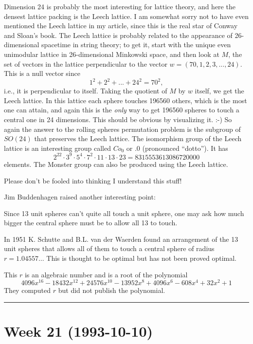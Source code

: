 \documentclass{article}
\begin{document}
Dimension 24 is probably the most interesting for lattice theory, and
here the densest lattice packing is the Leech lattice. I am somewhat
sorry not to have even mentioned the Leech lattice in my article, since
this is the real star of Conway and Sloan's book. The Leech lattice is
probably related to the appearance of 26-dimensional spacetime in string
theory; to get it, start with the unique even unimodular lattice in
26-dimensional Minkowski space, and then look at \(M\), the set of
vectors in the lattice perpendicular to the vector
\(w = (70,1,2,3,...,24)\). This is a null vector since
\[1^2 + 2^2 + ... + 24^2 = 70^2,\] i.e., it is perpendicular to itself.
Taking the quotient of \(M\) by \(w\) itself, we get the Leech lattice.
In this lattice each sphere touches 196560 others, which is the most one
can attain, and again this is the \emph{only} way to get 196560 spheres
to touch a central one in 24 dimensions. This should be obvious by
visualizing it. :-) So again the answer to the rolling spheres
permutation problem is the subgroup of \(SO(24)\) that preserves the
Leech lattice. The isomorphism group of the Leech lattice is an
interesting group called \(Co_0\) or \(.0\) (pronounced ``dotto''). It
has
\[2^{22}\cdot 3^9\cdot 5^4\cdot 7^2\cdot 11\cdot 13\cdot 23 = 8315553613086720000\]
elements. The Monster group can also be produced using the Leech
lattice.

Please don't be fooled into thinking I understand this stuff!

Jim Buddenhagen raised another interesting point:

Since 13 unit spheres can't quite all touch a unit sphere, one may ask
how much bigger the central sphere must be to allow all 13 to touch.

In 1951 K. Schutte and B.L. van der Waerden found an arrangement of the
13 unit spheres that allows all of them to touch a central sphere of
radius \(r=1.04557\ldots\) This is thought to be optimal but has not
been proved optimal.

This \(r\) is an algebraic number and is a root of the polynomial
\[4096 x^{16} -18432 x^{12} +24576 x^{10} -13952 x^8 +4096 x^6 -608x^4 +32 x^2 +1\]
They computed \(r\) but did not publish the polynomial.

\begin{center}\rule{0.5\linewidth}{0.5pt}\end{center}
\hypertarget{week21}{%
\section{Week 21 (1993-10-10)}\label{week21}}
\end{document}
